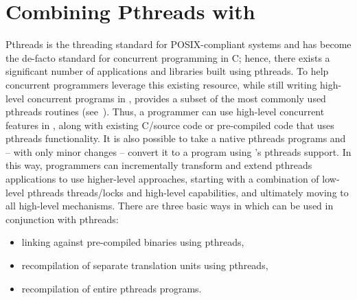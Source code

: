 \documentclass[openright,twoside]{report}
\begin{document}
\section{\texorpdfstring{Combining Pthreads with \uC}{Combining Pthreads with uC++}}

Pthreads is the threading standard for POSIX-compliant systems and has become the de-facto standard for concurrent programming in C;
hence, there exists a significant number of applications and libraries built using pthreads.
To help concurrent programmers leverage this existing resource, while still writing high-level concurrent programs in \CC, \uC provides a subset of the most commonly used pthreads routines (see~).
Thus, a \uC programmer can use high-level concurrent features in \uC, along with existing C/\CC source code or pre-compiled code that uses pthreads functionality.
It is also possible to take a native pthreads programs and --  with only minor changes --  convert it to a \uC program using \uC's pthreads support.
In this way, programmers can incrementally transform and extend pthreads applications to use higher-level \CC approaches, starting with a combination of low-level pthreads threads/locks and high-level \uC capabilities, and ultimately moving to all high-level mechanisms. 
There are three basic ways in which \uC can be used in conjunction with pthreads:
\begin{itemize}[topsep=4pt,parsep=0pt,itemsep=0pt]
\item linking against pre-compiled binaries using pthreads,
\item recompilation of separate translation units using pthreads,
\item recompilation of entire pthreads programs.
\end{itemize}
\end{document}
